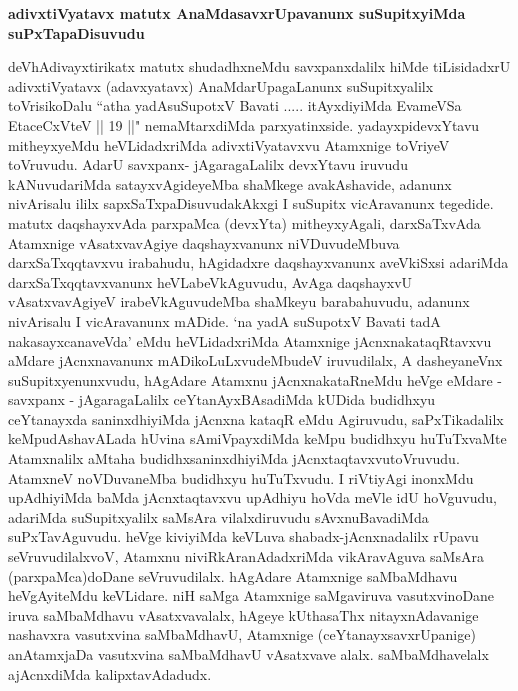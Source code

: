 \begin{center}
\begin{artha}
\bf{adivxtiVyatavx matutx AnaMdasavxrUpavanunx suSupitxyiMda suPxTapaDisuvudu}
\end{artha}
\end{center}

\begin{artha}
deVhAdivayxtirikatx matutx shudadhxneMdu savxpanxdalilx hiMde
tiLisidadxrU adivxtiVyatavx (adavxyatavx) AnaMdarUpagaLanunx
suSupitxyalilx toVrisikoDalu ``atha yadAsuSupotxV Bavati ..... itAyxdiyiMda EvameVSa EtaceCxVteV  || 19 ||" nemaMtarxdiMda parxyatinxside. yadayxpidevxYtavu mitheyxyeMdu heVLidadxriMda
adivxtiVyatavxvu Atamxnige toVriyeV toVruvudu. AdarU savxpanx-
jAgaragaLalilx devxYtavu iruvudu kANuvudariMda satayxvAgideyeMba
shaMkege avakAshavide, adanunx nivArisalu ililx
sapxSaTxpaDisuvudakAkxgi I suSupitx vicAravanunx tegedide. matutx
daqshayxvAda parxpaMca (devxYta) mitheyxyAgali, darxSaTxvAda Atamxnige
vAsatxvavAgiye daqshayxvanunx niVDuvudeMbuva darxSaTxqqtavxvu
irabahudu, hAgidadxre daqshayxvanunx aveVkiSxsi adariMda
darxSaTxqqtavxvanunx heVLabeVkAguvudu, AvAga daqshayxvU
vAsatxvavAgiyeV irabeVkAguvudeMba shaMkeyu barabahuvudu, adanunx
nivArisalu I vicAravanunx mADide. `na yadA suSupotxV Bavati tadA nakasayxcanaveVda' eMdu heVLidadxriMda Atamxnige
jAcnxnakataqRtavxvu aMdare jAcnxnavanunx mADikoLuLxvudeMbudeV
iruvudilalx, A dasheyaneVnx suSupitxyenunxvudu, hAgAdare Atamxnu
jAcnxnakataRneMdu heVge eMdare - savxpanx - jAgaragaLalilx
ceYtanAyxBAsadiMda kUDida budidhxyu ceYtanayxda saninxdhiyiMda jAcnxna
kataqR eMdu Agiruvudu, saPxTikadalilx keMpudAshavALada hUvina
sAmiVpayxdiMda keMpu budidhxyu huTuTxvaMte Atamxnalilx aMtaha
budidhxsaninxdhiyiMda jAcnxtaqtavxvutoVruvudu. AtamxneV noVDuvaneMba
budidhxyu huTuTxvudu. I riVtiyAgi inonxMdu upAdhiyiMda baMda
jAcnxtaqtavxvu upAdhiyu hoVda meVle idU hoVguvudu, adariMda
suSupitxyalilx saMsAra vilalxdiruvudu sAvxnuBavadiMda
suPxTavAguvudu. heVge kiviyiMda keVLuva shabadx-jAcnxnadalilx rUpavu
seVruvudilalxvoV, Atamxnu niviRkAranAdadxriMda vikAravAguva saMsAra
(parxpaMca)doDane seVruvudilalx. hAgAdare Atamxnige saMbaMdhavu
heVgAyiteMdu keVLidare. niH saMga Atamxnige saMgaviruva
vasutxvinoDane iruva saMbaMdhavu vAsatxvavalalx, hAgeye kUthasaThx
nitayxnAdavanige nashavxra vasutxvina saMbaMdhavU, Atamxnige
(ceYtanayxsavxrUpanige) anAtamxjaDa vasutxvina saMbaMdhavU
vAsatxvave alalx. saMbaMdhavelalx ajAcnxdiMda kalipxtavAdadudx.
\end{artha}


